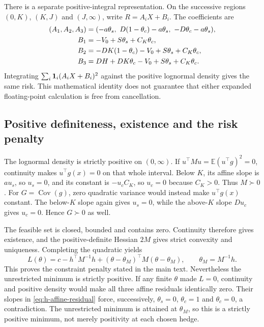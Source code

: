 \documentclass[11pt]{article}
\begin{document}
There is a separate positive-integral representation. On the successive
regions $(0,K)$, $(K,J)$ and $(J,\infty)$, write $R=A_iX+B_i$.
The coefficients are
\begin{align}
 (A_1,A_2,A_3)&=(-a\theta_s,\ D(1-\theta_c)-a\theta_s,\
 -D\theta_c-a\theta_s),\notag\\
 B_1&=-V_0+S\theta_s+C_K\theta_c,\notag\\
 B_2&=-DK(1-\theta_c)-V_0+S\theta_s+C_K\theta_c,\notag\\
 B_3&=DH+DK\theta_c-V_0+S\theta_s+C_K\theta_c.
 \label{eq:h-affine-residual}
\end{align}
Integrating $\sum_i{\bf1}_i(A_iX+B_i)^2$ against the positive
lognormal density gives the same risk. This mathematical identity
does not guarantee that either expanded floating-point calculation
is free from cancellation.

\subsection{Positive definiteness, existence and the risk penalty}

The lognormal density is strictly positive on $(0,\infty)$.
If $u^\top Mu=\mathbb E(u^\top g)^2=0$, continuity makes
$u^\top g(x)=0$ on that whole interval. Below $K$, its affine slope
is $au_s$, so $u_s=0$, and its constant is $-u_cC_K$, so
$u_c=0$ because $C_K>0$. Thus $M\succ0$.
For $G=\operatorname{Cov}(g)$, zero quadratic variance would instead
make $u^\top g(x)$ constant. The below-$K$ slope again gives
$u_s=0$, while the above-$K$ slope $Du_c$ gives $u_c=0$.
Hence $G\succ0$ as well.

The feasible set is closed, bounded and contains zero. Continuity
therefore gives existence, and the positive-definite Hessian $2M$
gives strict convexity and uniqueness. Completing the quadratic yields
\begin{equation}
 L(\theta)=c-h^\top M^{-1}h+
 (\theta-\theta_M)^\top M(\theta-\theta_M),\qquad
 \theta_M=M^{-1}h.
 \label{eq:h-square-completion}
\end{equation}
This proves the constraint penalty stated in the main text.
Nevertheless the unrestricted minimum is strictly positive. If any
finite $\theta$ made $L=0$, continuity and positive density would
make all three affine residuals identically zero. Their slopes
in \eqref{eq:h-affine-residual} force, successively, $\theta_s=0$,
$\theta_c=1$ and $\theta_c=0$, a contradiction. The unrestricted
minimum is attained at $\theta_M$, so this is a strictly positive
minimum, not merely positivity at each chosen hedge.
\end{document}
